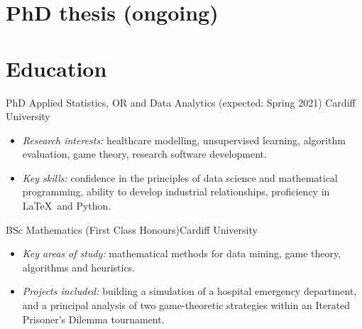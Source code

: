 \documentclass[10pt,a4paper,sans]{moderncv}
\begin{document}
\makecvtitle%

\section{PhD thesis (ongoing)}

\section{Education}

%
    {PhD Applied Statistics, OR and Data Analytics (expected: Spring 2021)}%
    {Cardiff University}{}{}{%
    \begin{itemize}
        \item \emph{Research interests:} healthcare modelling, unsupervised
            learning, algorithm evaluation, game theory, research software
            development.
        \item \emph{Key skills:} confidence in the principles of data science
            and mathematical programming, ability to develop industrial
            relationships, proficiency in \LaTeX\ and Python.
    \end{itemize}
}

%
    {BSc Mathematics (First Class Honours)}{Cardiff University}{}{}{%
        \begin{itemize}
            \item \emph{Key areas of study:} mathematical methods for data
                mining, game theory, algorithms and heuristics.
            \item \emph{Projects included:} building a simulation of a hospital
                emergency department, and a principal analysis of two
                game-theoretic strategies within an Iterated Prisoner's Dilemma
                tournament.
    \end{itemize}
}
\end{document}
